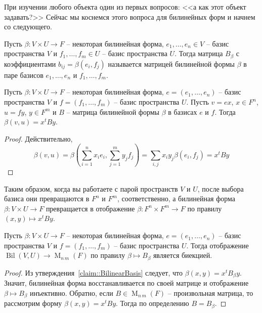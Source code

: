 При изучении любого объекта один из первых вопросов: <<а как этот объект задавать?>> Сейчас мы коснемся этого вопроса для билинейных форм и начнем со следующего.

\begin{definition}
Пусть $\beta\colon V\times U\to F$ -- некоторая билинейная форма,  $e_1,\ldots,e_n\in V$ -- базис пространства $V$ и $f_1,\ldots,f_m\in U$ -- базис пространства $U$.
Тогда матрица $B_\beta$ с коэффициентами $b_{ij} = \beta(e_i,f_j)$ называется матрицей билинейной формы $\beta$ в паре базисов $e_1,\ldots,e_n$ и $f_1,\ldots,f_m$.
\end{definition}


\begin{claim}
\label{claim::BilinearBasis}
Пусть $\beta\colon V\times U\to F$ -- некоторая билинейная форма,  $e = (e_1,\ldots,e_n)$ -- базис пространства $V$ и $f=(f_1,\ldots,f_m)$ -- базис пространства $U$.
Пусть $v = ex$, $x\in F^n$, $u =fy$, $y\in F^m$ и $B$ -- матрица билинейной формы $\beta$ в базисах $e$ и $f$.
Тогда $\beta(v,u) = x^t B y$.
\end{claim}
\begin{proof}
Действительно, 
\[
\beta(v,u) = \beta(\sum_{i=1}^n x_i e_i, \sum_{j=1}^m y_j f_j) = \sum_{i,j} x_iy_j\beta(e_i, f_j) = x^t B y
\]
\end{proof}

Таким образом, когда вы работаете с парой пространств $V$ и $U$, после выбора базиса они превращаются в $F^n$ и $F^m$, соответственно, а билинейная форма $\beta\colon V\times U\to F$ превращается в отображение $\beta\colon F^n \times F^m \to F$ по правилу $(x,y)\mapsto x^t B y$.

\begin{claim}
\label{claim::BilinearMatrices}
Пусть $\beta\colon V\times U\to F$ -- некоторая билинейная форма,  $e = (e_1,\ldots,e_n)$ -- базис пространства $V$ и $f=(f_1,\ldots,f_m)$ -- базис пространства $U$.
Тогда отображение $\operatorname{Bil}(V,U)\to \operatorname{M}_{n\,m}(F)$ по правилу $\beta\mapsto B_\beta$ является биекцией.
\end{claim}
\begin{proof}
Из утверждения~\ref{claim::BilinearBasis} следует, что $\beta(x,y) = x^t B_\beta y$.
Значит, билинейная форма восстанавливается по своей матрице и отображение $\beta\mapsto B_\beta$ инъективно.
Обратно, если $B\in \operatorname{M}_{n\,m}(F)$ -- произвольная матрица, то рассмотрим форму $\beta(x,y) = x^t B y$.
Тогда по определению $B = B_\beta$.
\end{proof}
